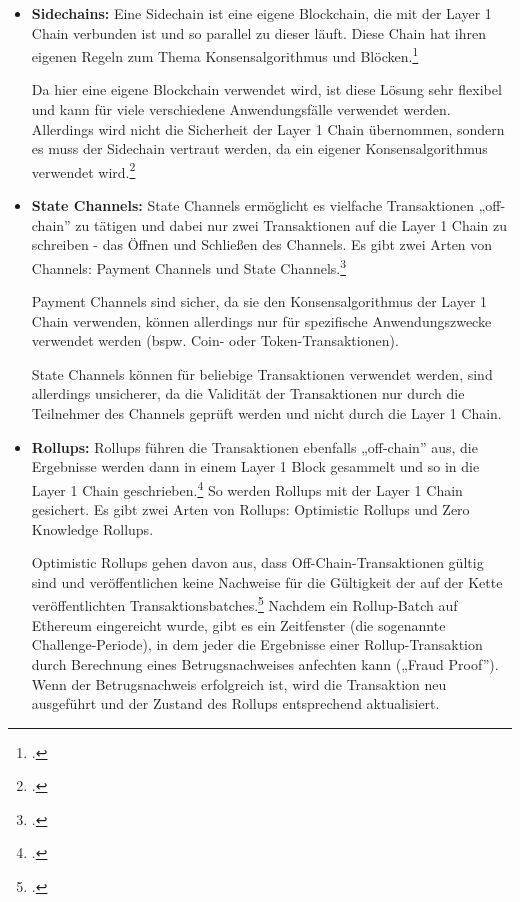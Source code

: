 \begin{itemize}
    \item \textbf{Sidechains:} 
    Eine Sidechain ist eine eigene Blockchain, die mit der Layer 1 Chain verbunden ist und so parallel zu dieser läuft. 
    Diese Chain hat ihren eigenen Regeln zum Thema Konsensalgorithmus und Blöcken.\footcite[Vgl. hierzu und weiterführend][]{w20}

    \noindent
    Da hier eine eigene Blockchain verwendet wird, ist diese Lösung sehr flexibel und kann für viele verschiedene Anwendungsfälle verwendet werden.
    Allerdings wird nicht die Sicherheit der Layer 1 Chain übernommen, sondern es muss der Sidechain vertraut werden, da ein eigener Konsensalgorithmus verwendet wird.\footcite[Vgl.][]{w21}


    \item \textbf{State Channels:}
    State Channels ermöglicht es vielfache Transaktionen „off-chain” zu tätigen und dabei nur zwei Transaktionen auf die Layer 1 Chain zu schreiben - das Öffnen und Schließen des Channels.
    Es gibt zwei Arten von Channels: Payment Channels und State Channels.\footcite[Vgl. hierzu, zum Folgenden und weiterführend][]{w19}

    \noindent
    Payment Channels sind sicher, da sie den Konsensalgorithmus der Layer 1 Chain verwenden, können allerdings nur für spezifische Anwendungszwecke verwendet werden (bspw. Coin- oder Token-Transaktionen).

    \noindent
    State Channels können für beliebige Transaktionen verwendet werden, sind allerdings unsicherer, da die Validität der Transaktionen nur durch die Teilnehmer des Channels geprüft werden und nicht durch die Layer 1 Chain.


    \item \textbf{Rollups:}
    Rollups führen die Transaktionen ebenfalls „off-chain” aus, die Ergebnisse werden dann in einem Layer 1 Block gesammelt und so in die Layer 1 Chain geschrieben.\footcite[Vgl. hierzu und zum Folgenden][]{w18} 
    So werden Rollups mit der Layer 1 Chain gesichert.
    Es gibt zwei Arten von Rollups: Optimistic Rollups und Zero Knowledge Rollups.

    \noindent
    Optimistic Rollups gehen davon aus, dass Off-Chain-Transaktionen gültig sind und veröffentlichen keine Nachweise für die Gültigkeit der auf der Kette veröffentlichten Transaktionsbatches.\footcite[Vgl. hierzu, zum Folgenden und weiterführend][]{w22}
    Nachdem ein Rollup-Batch auf Ethereum eingereicht wurde, gibt es ein Zeitfenster (die sogenannte Challenge-Periode), in dem jeder die Ergebnisse einer Rollup-Transaktion durch Berechnung eines Betrugsnachweises anfechten kann („Fraud Proof”).
    Wenn der Betrugsnachweis erfolgreich ist, wird die Transaktion neu ausgeführt und der Zustand des Rollups entsprechend aktualisiert.


\end{itemize}
